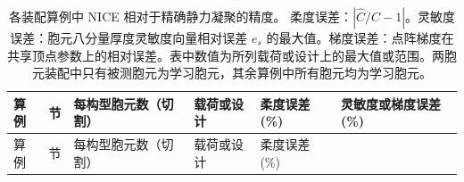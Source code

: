\documentclass[preprint,12pt,authoryear]{elsarticle}
\begin{document}
{\footnotesize
\begin{longtable}[]{@{}
  >{\raggedright\arraybackslash}p{}
  >{\raggedright\arraybackslash}p{}
  >{\raggedright\arraybackslash}p{}
  >{\raggedright\arraybackslash}p{}
  >{\raggedleft\arraybackslash}p{}
  >{\raggedright\arraybackslash}p{}@{}}
\caption{各装配算例中 NICE 相对于精确静力凝聚的精度。 柔度误差：\(|\widehat C/C-1|\)。灵敏度误差：胞元八分量厚度灵敏度向量相对误差 \(e_s\) 的最大值。梯度误差：点阵梯度在共享顶点参数上的相对误差。表中数值为所列载荷或设计上的最大值或范围。两胞元装配中只有被测胞元为学习胞元，其余算例中所有胞元均为学习胞元。}\tabularnewline
\toprule\noalign{}
\begin{minipage}[b]{\linewidth}\raggedright
算例
\end{minipage} & \begin{minipage}[b]{\linewidth}\raggedright
节
\end{minipage} & \begin{minipage}[b]{\linewidth}\raggedright
每构型胞元数（切割）
\end{minipage} & \begin{minipage}[b]{\linewidth}\raggedright
载荷或设计
\end{minipage} & \begin{minipage}[b]{\linewidth}\raggedleft
柔度误差 (\%)
\end{minipage} & \begin{minipage}[b]{\linewidth}\raggedright
灵敏度或梯度误差 (\%)
\end{minipage} \\
\midrule\noalign{}
\endfirsthead
\toprule\noalign{}
\begin{minipage}[b]{\linewidth}\raggedright
算例
\end{minipage} & \begin{minipage}[b]{\linewidth}\raggedright
节
\end{minipage} & \begin{minipage}[b]{\linewidth}\raggedright
每构型胞元数（切割）
\end{minipage} & \begin{minipage}[b]{\linewidth}\raggedright
载荷或设计
\end{minipage} & \begin{minipage}[b]{\linewidth}\raggedleft
柔度误差 (\%)

\end{minipage}
\end{longtable}}
\end{document}
